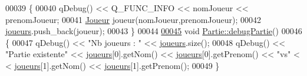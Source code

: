 \begin{DoxyCode}
00039 \{
00040     qDebug() << Q\_FUNC\_INFO << nomJoueur << prenomJoueur;
00041     \hyperlink{class_joueur}{Joueur} joueur(nomJoueur,prenomJoueur);
00042     \hyperlink{class_partie_a98fa2810599b3eb46d57df2b5836a3f4}{joueurs}.push\_back(joueur);
00043 \}
00044 
\hyperlink{class_partie_aea05906078462b32bf08a3172ab14328}{00045} \textcolor{keywordtype}{void} \hyperlink{class_partie_aea05906078462b32bf08a3172ab14328}{Partie::debugPartie}()
00046 \{
00047     qDebug() << \textcolor{stringliteral}{"Nb joueurs : "} << \hyperlink{class_partie_a98fa2810599b3eb46d57df2b5836a3f4}{joueurs}.size();
00048     qDebug() << \textcolor{stringliteral}{"Partie existente"} << \hyperlink{class_partie_a98fa2810599b3eb46d57df2b5836a3f4}{joueurs}[0].getNom() << \hyperlink{class_partie_a98fa2810599b3eb46d57df2b5836a3f4}{joueurs}[0].getPrenom() << \textcolor{stringliteral}{"vs"} <
      < \hyperlink{class_partie_a98fa2810599b3eb46d57df2b5836a3f4}{joueurs}[1].getNom() << \hyperlink{class_partie_a98fa2810599b3eb46d57df2b5836a3f4}{joueurs}[1].getPrenom();
00049 \}
\end{DoxyCode}
